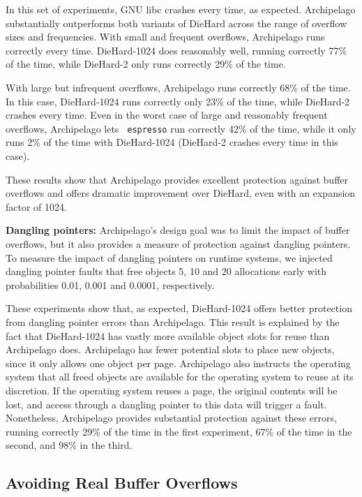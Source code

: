 \documentclass{acm_proc_article-sp}
\begin{document}
In this set of experiments, GNU libc crashes every time, as
expected. Archipelago substantially outperforms both variants of
DieHard across the range of overflow sizes and frequencies. With small
and frequent overflows, Archipelago runs correctly every
time. DieHard-1024 does reasonably well, running correctly 77\% of the
time, while DieHard-2 only runs correctly 29\% of the time.

With large but infrequent overflows, Archipelago runs correctly 68\%
of the time. In this case, DieHard-1024 runs correctly only 23\% of
the time, while DieHard-2 crashes every time. Even in the worst case
of large and reasonably frequent overflows, Archipelago lets {\tt
espresso} run correctly 42\% of the time, while it only runs 2\% of
the time with DieHard-1024 (DieHard-2 crashes every time in this
case).

These results show that Archipelago provides excellent protection
against buffer overflows and offers dramatic improvement over DieHard,
even with an expansion factor of 1024.

{\bf Dangling pointers:} Archipelago's design goal was to limit the
impact of buffer overflows, but it also provides a measure of
protection against dangling pointers. To measure the impact of
dangling pointers on runtime systems, we injected dangling pointer
faults that free objects 5, 10 and 20 allocations early with
probabilities 0.01, 0.001 and 0.0001, respectively.

These experiments show that, as expected, DieHard-1024 offers better
protection from dangling pointer errors than Archipelago. This result
is explained by the fact that DieHard-1024 has vastly more available
object slots for reuse than Archipelago does. Archipelago has fewer
potential slots to place new objects, since it only allows one object
per page. Archipelago also instructs the operating system that all
freed objects are available for the operating system to reuse at its
discretion. If the operating system reuses a page, the original
contents will be lost, and access through a dangling pointer to this
data will trigger a fault. Nonetheless, Archipelago provides
substantial protection against these errors, running correctly 29\% of
the time in the first experiment, 67\% of the time in the second, and
98\% in the third.

\subsection{Avoiding Real Buffer Overflows}
\label{sec:eval-bug}
\end{document}
